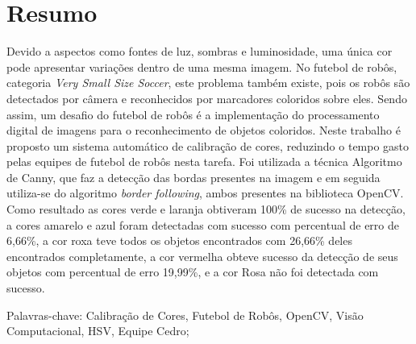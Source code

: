 
\chapter*{Resumo}

Devido a aspectos como fontes de luz, sombras e luminosidade, uma única cor pode apresentar variações dentro de uma mesma imagem. No futebol de robôs, categoria {\it Very Small Size Soccer}, este problema também existe, pois os robôs são detectados por câmera e reconhecidos por marcadores coloridos sobre eles. Sendo assim, um desafio do futebol de robôs é a implementação do processamento digital de imagens para o reconhecimento de objetos coloridos. Neste trabalho é proposto um sistema automático de calibração de cores, reduzindo o tempo gasto pelas equipes de futebol de robôs nesta tarefa. Foi utilizada a técnica Algoritmo de Canny, que faz a detecção das bordas presentes na imagem e em seguida utiliza-se do algoritmo {\it border following}, ambos presentes na biblioteca OpenCV. Como resultado as cores verde e laranja obtiveram 100\% de sucesso na detecção, a cores amarelo e azul foram detectadas com sucesso com percentual de erro de 6,66\%, a cor roxa teve todos os objetos encontrados com 26,66\% deles encontrados completamente, a cor vermelha obteve sucesso da detecção de seus objetos com percentual de erro 19,99\%, e a cor Rosa não foi detectada com sucesso.


Palavras-chave: Calibração de Cores, Futebol de Robôs, OpenCV, Visão Computacional, HSV, Equipe Cedro;
